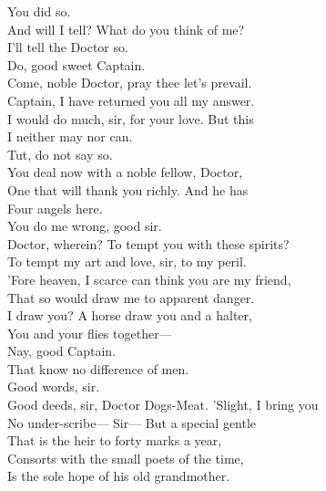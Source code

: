 \documentclass[a4paper,oneside,12pt]{memoir}
\begin{document}
\begin{drama*}
\facespeaks {} You did so.\\
\dapperspeaks And will I tell? What do you think of me?\\
\facespeaks I'll tell the Doctor so.\\
\dapperspeaks {} Do, good sweet Captain.\\
\facespeaks Come, noble Doctor, pray thee let's prevail.\\
\subtlespeaks Captain, I have returned you all my answer.\\
I would do much, sir, for your love. But this\\
I neither may nor can.\\
\facespeaks {} Tut, do not say so.\\
You deal now with a noble fellow, Doctor,\\
One that will thank you richly. And he has\\
Four angels here.\\
\subtlespeaks {} You do me wrong, good sir.\\
\facespeaks Doctor, wherein? To tempt you with these spirits?\\
\subtlespeaks To tempt my art and love, sir, to my peril.\\
'Fore heaven, I scarce can think you are my friend,\\
That so would draw me to apparent danger.\\
\facespeaks I draw you? A horse draw you and a halter,\\
You and your flies together---\\
\dapperspeaks {} Nay, good Captain.\\
\facespeaks That know no difference of men.\\
\subtlespeaks {} Good words, sir.\\
\facespeaks Good deeds, sir, Doctor Dogs-Meat. 'Slight, I bring you\\
No under-scribe---
\dapperspeaks {} Sir---
\facespeaks {} But a special gentle\\
That is the heir to forty marks a year,\\
Consorts with the small poets of the time,\\
Is the sole hope of his old grandmother.\\

\end{drama*}
\end{document}

